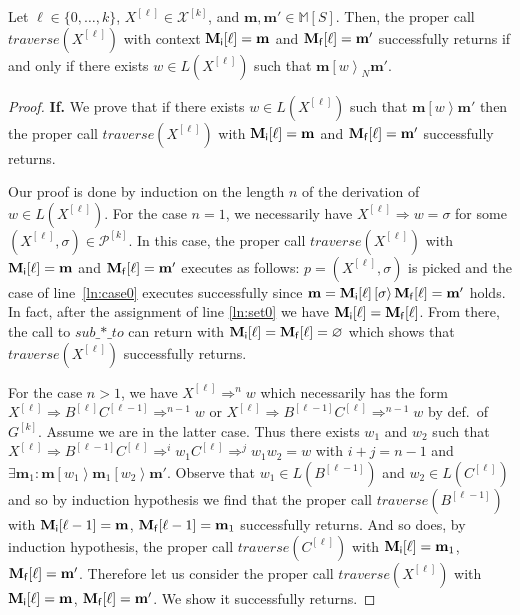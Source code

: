 \documentclass{fsttcs}
\newcommand{\multiset}[1]{{\mathbb{M}[ #1 ]}}
\def\mmap{\mathbf{m}}
\newcommand{\fire}[1]{\left[ {#1}\right\rangle}
\def\prod{\mathcal{P}}
\def\subto{\mathit{sub\_\mathord{\ast}\_to}}
\begin{document}
\begin{lemma}
	Let $\ell \in \{0,\ldots,k\}$, \(X^{[\ell]}\in \mathcal{X}^{[k]}\), and
	$\mmap,\mmap'\in\multiset{S}$. Then, the proper call
	\(\mathit{traverse}(X^{[\ell]})\) with context $\mathbf{M_{\sf i}}[\ell]=\mmap$
  and $\mathbf{M_{\sf f}}[\ell]=\mmap'$
successfully returns  if and only if  there exists $w \in
	L(X^{[\ell]})$ such that \(\mmap
	\fire{w}_N\mmap'\).\label{lem:alg_equiv}
\end{lemma}
\begin{proof}
{\bf If.}
We prove that if there exists \(w\in L(X^{[\ell]})\) such that
\(\mmap\fire{w}\mmap'\) then the proper call
\(\mathit{traverse}(X^{[\ell]})\) with \(\mathbf{M_{\sf i}}[\ell]=\mmap\) and
\(\mathbf{M_{\sf f}}[\ell]=\mmap'\) successfully returns.


Our proof is done by induction on the length \(n\) of the derivation of \(w\in L(X^{[\ell]})\).
For the case \(n=1\), we necessarily have \(X^{[\ell]}\Rightarrow w=\sigma\) for some \( (X^{[\ell]},\sigma)\in\prod^{[k]}\).
In this case, the proper call \(\mathit{traverse}(X^{[\ell]})\) with \(\mathbf{M_{\sf i}}[\ell]=\mmap\) and
\(\mathbf{M_{\sf f}}[\ell]=\mmap'\) executes as follows: 
\(p=(X^{[\ell]},\sigma)\) is picked and the case of line~\ref{ln:case0} executes successfully
since \(\mmap=\mathbf{M_{\sf i}}[\ell]\fire{\sigma}\mathbf{M_{\sf f}}[\ell]=\mmap'\) holds.
In fact, after the assignment of line \ref{ln:set0} we have \(\mathbf{M_{\sf
i}}[\ell]=\mathbf{M_{\sf f}}[\ell]\). From there, the call to \(\subto\)
can return with \(\mathbf{M_{\sf i}}[\ell]=\mathbf{M_{\sf
f}}[\ell]=\varnothing\) which shows that \(\mathit{traverse}(X^{[\ell]})\)
successfully returns.

\medskip For the case \(n>1\), we have \(X^{[\ell]}\Rightarrow^{n} w\) which
necessarily has the form \(X^{[\ell]}\Rightarrow B^{[\ell]} C^{[\ell-1]}\Rightarrow^{n-1} w\)
or \(X^{[\ell]}\Rightarrow B^{[\ell-1]} C^{[\ell]}\Rightarrow^{n-1} w\) by def.\ of \(G^{[k]}\).
Assume we are in the latter case. Thus there exists \(w_1\) and \(w_2\) such
that \(X^{[\ell]}\Rightarrow B^{[\ell-1]} C^{[\ell]}\Rightarrow^{i} w_1 C^{[\ell]}\Rightarrow^{j} w_1 w_2=w\) with \(i+j=n-1\)
and \(\exists \mmap_1\colon \mmap\fire{w_1} \mmap_1\fire{w_2} \mmap'\).
Observe that \(w_1\in L(B^{[\ell-1]})\) and \(w_2\in L(C^{[\ell]})\) and so
by induction hypothesis we find that the proper call \(\mathit{traverse}(B^{[\ell-1]})\)
with \(\mathbf{M_{\sf i}}[\ell-1]=\mmap\), \(\mathbf{M_{\sf f}}[\ell-1]=\mmap_1\) successfully returns.
And so does, by induction hypothesis, the proper call \(\mathit{traverse}(C^{[\ell]})\) with
\(\mathbf{M_{\sf i}}[\ell]=\mmap_1\), \(\mathbf{M_{\sf f}}[\ell]=\mmap'\).
Therefore let us consider the proper call \(\mathit{traverse}(X^{[\ell]})\) with \(\mathbf{M_{\sf i}}[\ell]=\mmap\), \(\mathbf{M_{\sf f}}[\ell]=\mmap'\). We show it successfully returns.


\end{proof}
\end{document}

